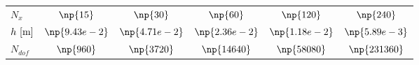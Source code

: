 

%

\begin{tabular}{rrrrcrc}
\toprule

\multicolumn{2}{l}{$ N_x $}
  &  \multicolumn{1}{c}{$ \np{15} $}
  &  \multicolumn{1}{c}{$ \np{30} $}
  &  \multicolumn{1}{c}{$ \np{60} $}
  &  \multicolumn{1}{c}{$ \np{120} $}
  &  \multicolumn{1}{c}{$ \np{240} $}
  \\

\multicolumn{2}{l}{$ h~[\textup{m}] $}
  &  \multicolumn{1}{c}{$ \np{9.43e-2} $}
  &  \multicolumn{1}{c}{$ \np{4.71e-2} $}
  &  \multicolumn{1}{c}{$ \np{2.36e-2} $}
  &  \multicolumn{1}{c}{$ \np{1.18e-2} $}
  &  \multicolumn{1}{c}{$ \np{5.89e-3} $}
  \\

\multicolumn{2}{l}{$ N_{dof} $}
  &  \multicolumn{1}{c}{$ \np{960} $}
  &  \multicolumn{1}{c}{$ \np{3720} $}
  &  \multicolumn{1}{c}{$ \np{14640} $}
  &  \multicolumn{1}{c}{$ \np{58080} $}
  &  \multicolumn{1}{c}{$ \np{231360} $}
  \\

\midrule


\end{tabular}
